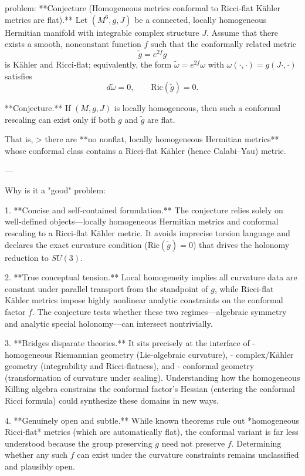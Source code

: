 problem:  
**Conjecture (Homogeneous metrics conformal to Ricci‑flat Kähler metrics are flat).**  
Let \((M^6,g,J)\) be a connected, locally homogeneous Hermitian manifold with integrable complex structure \(J\).  
Assume that there exists a smooth, nonconstant function \(f\) such that the conformally related metric  
\[
\tilde g = e^{2f} g
\]
is Kähler and Ricci‑flat; equivalently, the form \(\tilde \omega = e^{2f}\omega\) with \(\omega(\cdot,\cdot)= g(J\cdot,\cdot)\) satisfies  
\[
d\tilde\omega = 0, \qquad \mathrm{Ric}(\tilde g) = 0.
\]
  
**Conjecture.**  
If \((M,g,J)\) is locally homogeneous, then such a conformal rescaling can exist only if both \(g\) and \(\tilde g\) are flat.  

That is,  
> there are **no nonflat, locally homogeneous Hermitian metrics** whose conformal class contains a Ricci‑flat Kähler (hence Calabi–Yau) metric.

---

Why is it a "good" problem:  

1. **Concise and self‑contained formulation.**  
   The conjecture relies solely on well‑defined objects—locally homogeneous Hermitian metrics and conformal rescaling to a Ricci‑flat Kähler metric. It avoids imprecise torsion language and declares the exact curvature condition (\(\mathrm{Ric}(\tilde g)=0\)) that drives the holonomy reduction to \(SU(3)\).

2. **True conceptual tension.**  
   Local homogeneity implies all curvature data are constant under parallel transport from the standpoint of \(g\), while Ricci‑flat Kähler metrics impose highly nonlinear analytic constraints on the conformal factor \(f\). The conjecture tests whether these two regimes—algebraic symmetry and analytic special holonomy—can intersect nontrivially.  

3. **Bridges disparate theories.**  
   It sits precisely at the interface of  
   - homogeneous Riemannian geometry (Lie‑algebraic curvature),  
   - complex/Kähler geometry (integrability and Ricci‑flatness), and  
   - conformal geometry (transformation of curvature under scaling).  
   Understanding how the homogeneous Killing algebra constrains the conformal factor’s Hessian (entering the conformal Ricci formula) could synthesize these domains in new ways.

4. **Genuinely open and subtle.**  
   While known theorems rule out *homogeneous Ricci‑flat* metrics (which are automatically flat), the conformal variant is far less understood because the group preserving \(g\) need not preserve \(f\). Determining whether any such \(f\) can exist under the curvature constraints remains unclassified and plausibly open.  

